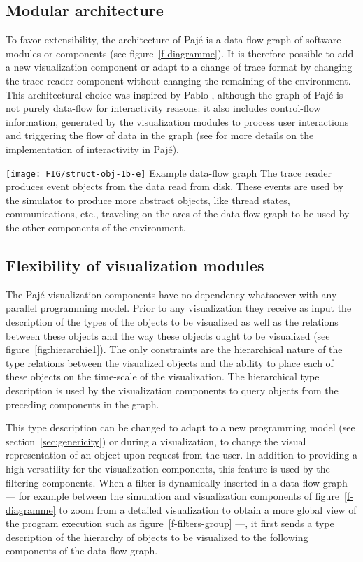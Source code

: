 \subsection{Modular architecture}
\label{sec:modular}

To favor extensibility, the architecture of Pajé is a data flow graph
of software modules or components (see figure~\ref{f-diagramme}). It
is therefore possible to add a new visualization component or adapt to
a change of trace format by changing the trace reader component
without changing the remaining of the environment.  This architectural
choice was inspired by Pablo \cite{pablo}, although the graph of Pajé
is not purely data-flow for interactivity reasons: it also includes
control-flow information, generated by the visualization modules to
process user interactions and triggering the flow of data in the graph
(see \cite{ChassinS00,ChassinS:2000a,Stein:1999} for more details on
the implementation of interactivity in Pajé).

           {\texttt{[image: FIG/struct-obj-1b-e]}} {Example data-flow
           graph} {The trace reader produces event objects from the
           data read from disk. These events are used by the simulator
           to produce more abstract objects, like thread states,
           communications, etc., traveling on the arcs of the
           data-flow graph to be used by the other components of the
           environment.}


\subsection{Flexibility of visualization modules}
\label{sec:flexibility}

The Pajé visualization components have no dependency whatsoever with
any parallel programming model. Prior to any visualization they
receive as input the description of the types of the objects to be
visualized as well as the relations between these objects and the way
these objects ought to be visualized (see
figure~\ref{fig:hierarchie1}). The only constraints are the
hierarchical nature of the type relations between the visualized
objects and the ability to place each of these objects on the
time-scale of the visualization. The hierarchical type description is
used by the visualization components to query objects from the
preceding components in the graph.

This type description can be changed to adapt to a new programming
model (see section~\ref{sec:genericity}) or during a visualization, to
change the visual representation of an object upon request from the
user. In addition to providing a high versatility for the
visualization components, this feature is used by the filtering
components. When a filter is dynamically inserted in a data-flow graph
--- for example between the simulation and visualization components of
figure~\ref{f-diagramme} to zoom from a detailed visualization to
obtain a more global view of the program execution such as
figure~\ref{f-filters-group} ---, it first sends a type description of
the hierarchy of objects to be visualized to the following components
of the data-flow graph.

